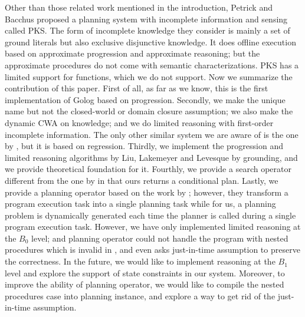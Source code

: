 \documentclass[letterpaper]{article}
\begin{document}
Other than those related work mentioned in the introduction, Petrick and Bacchus  proposed a planning system with incomplete information and sensing called PKS. The form of incomplete knowledge they consider is mainly a set of ground literals but also exclusive disjunctive knowledge.
It does offline execution based on approximate progression and approximate reasoning; but the approximate procedures do not come with semantic characterizations.
PKS has a limited support for functions, which we do not support.
Now we summarize the contribution of this paper. First of all,
as far as we know, this is the first implementation of Golog based on progression.
Secondly, we make the unique name but not the closed-world or domain closure assumption; we also make
the dynamic CWA on knowledge; and we do limited reasoning with first-order incomplete information. The only
other similar system we are aware of is the one by \cite{CL09}, but it is based on regression.
 Thirdly, we implement the progression and limited reasoning algorithms by Liu,
Lakemeyer and Levesque by grounding, and we provide theoretical foundation for it. Fourthly, we provide a search operator different from the one by \cite{GLS01} in that ours returns a conditional plan. Lastly,
 we provide a planning operator based on the work by \cite{BFM07}; however, they
transform a program execution task into a single planning task while for us, a planning problem is dynamically generated each time the planner is called
during a single program execution task.
However, we have only implemented limited reasoning at the $B_0$ level;
and planning operator could not handle the program with nested procedures which is invalid in \cite{BFM07}, and even asks just-in-time assumption to preserve the correctness.
In the future, we would like to implement reasoning at the $B_1$ level and explore the support of state constraints in our system. 
Moreover, to improve the ability of planning operator, we would like to compile the nested procedures case into planning instance, and explore a way to get rid of the just-in-time assumption.

\small


\end{document}
